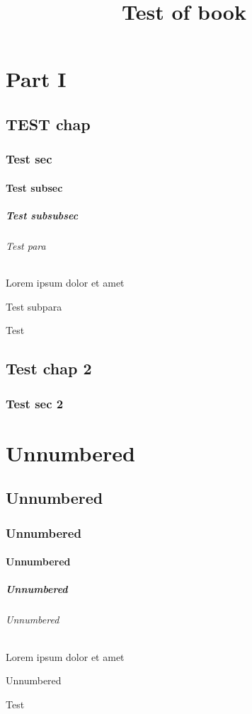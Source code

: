 \documentclass{book}
\title{Test of book}
\begin{document}
    \frontmatter
    \tableofcontents
    
    \part{Part I}
    \chapter{TEST chap}
    \section{Test sec}
    \subsection{Test subsec}
    \subsubsection{Test subsubsec}
    \paragraph{Test para} Lorem ipsum dolor et amet
    \subparagraph{Test subpara}
    Test
    \chapter{Test chap 2}
    \section{Test sec 2}
    
    \part*{Unnumbered}
    \chapter*{Unnumbered}
    \section*{Unnumbered}
    \subsection*{Unnumbered}
    \subsubsection*{Unnumbered}
    \paragraph*{Unnumbered} Lorem ipsum dolor et amet
    \subparagraph*{Unnumbered}
    Test
\end{document}

